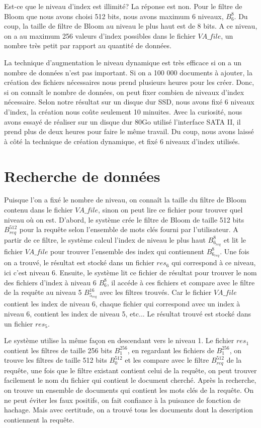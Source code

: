 	Est-ce que le niveau d'index est illimité? La réponse est non. Pour le filtre de Bloom que nous avons choisi 512 bits, nous avons maximum 6 niveaux, $B^{8}_6$. Du coup, la taille de filtre de Bloom au niveau le plus haut est de 8 bits. A ce niveau, on a au maximum 256 valeurs d'index possibles dans le fichier $VA\_file$, un nombre très petit par rapport au quantité de données. 
	
	La technique d'augmentation le niveau dynamique est très efficace si on a un nombre de données n'est pas important. Si on a 100 000 documents à ajouter, la création des fichiers nécessaires nous prend plusieurs heures pour les créer. Donc, si on connaît le nombre de données, on peut fixer combien de niveaux d'index nécessaire. Selon notre résultat sur un disque dur SSD, nous avons fixé 6 niveaux d'index, la création nous coûte seulement 10 minuites. Avec la curiosité, nous avons essayé de réaliser sur un disque dur 80Go utilisé l'interface SATA II, il prend plus de deux heures pour faire le même travail. Du coup, nous avons laissé à côté la technique de création dynamique, et fixé 6 niveaux d'index utilisés.	
	
\section{Recherche de données}
	Puisque l'on a fixé le nombre de niveau, on connaît la taille du filtre de Bloom contenu dans le fichier $VA\_file$, sinon on peut lire ce fichier pour trouver quel niveau où on est. D'abord, le système crée le filtre de Bloom de taille 512 bits $B^{512}_{req}$ pour la requête selon l'ensemble de mots clés fourni par l'utilisateur. A partir de ce filtre, le système calcul l'index de niveau le plus haut $B^{8}_{6_{req}}$ et lit le fichier $VA\_file$ pour trouver l'ensemble des index qui contiennent $B^{8}_{6_{req}}$. Une fois on a trouvé, le résultat est stocké dans un fichier $res_6$ qui correspond à ce niveau, ici c'est niveau 6. Ensuite, le système lit ce fichier de résultat pour trouver le nom des fichiers d'index à niveau 6 $B^{8}_{6}$, il accéde à ces fichiers et compare avec le filtre de la requête au niveau 5 $B^{16}_{5_{req}}$ avec les filtres trouvés. Car le fichier $VA\_file$ contient les index de niveau 6, chaque fichier qui correspond avec un index à niveau 6, contient les index de niveau 5, etc... Le résultat trouvé est stocké dans un fichier $res_5$. 
	
	Le système utilise la même façon en descendant vers le niveau 1. Le fichier $res_1$ contient les filtres de taille 256 bits $B^{256}_{1}$, en regardant les fichiers de $B^{256}_{1}$, on trouve les filtres de taille 512 bits $B^{512}_{0}$ et les compare avec le filtre $B^{512}_{req}$ de la requête, une fois que le filtre existant contient celui de la requête, on peut trouver facilement le nom du fichier qui contient le document cherché. Après la recherche, on trouve un ensemble de documents qui contient les mots clés de la requête. On ne peut éviter les faux positifs, on fait confiance à la puisance de fonction de hachage. Mais avec certitude, on a trouvé tous les documents dont la description contiennent la requête.

